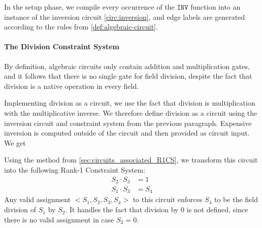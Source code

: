In the setup phase, we compile every occurrence of the $\mathtt{INV}$ function into an instance of the inversion circuit \ref{circ:inversion}, and edge labels are generated according to the rules from \ref{def:algebraic-circuit}.
\paragraph{The Division Constraint System}
\label{def:division_circuit} By definition, algebraic circuits only contain addition and multiplication gates, and it follows that there is no single gate for field division, despite the fact that division is a native operation in every field.

Implementing division as a circuit, we use the fact that division is multiplication with the multiplicative inverse. We therefore define division as a circuit using the inversion circuit and constraint system from the previous paragraph. Expensive inversion is computed outside of the circuit and then provided as circuit input. We get 
\begin{center}
\end{center} 
Using the method from \ref{sec:circuits_associated_R1CS}, we transform this circuit into the following Rank-1 Constraint System:
\begin{align*}
S_2 \cdot S_3 &= 1\\
S_1 \cdot S_3 &= S_4
\end{align*}
Any valid assignment $<S_1,S_2,S_3,S_4>$ to this circuit enforces $S_4$ to be the field division of $S_1$ by $S_2$. It handles the fact that division by $0$ is not defined, since there is no valid assignment in case $S_2=0$. 

